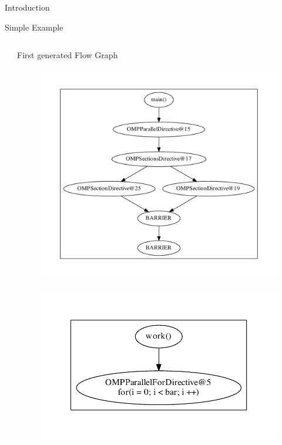 \documentclass[xcolor=dvipsnames]{beamer}
\begin{document}
\begin{section}{Introduction}
\begin{frame}[fragile]{\hskip 0.3cm Simple Example}
\begin{columns}
\begin{column}{5cm}
\end{column}

\begin{column}{6.5cm}
First generated Flow Graph
\vskip -0.5cm
\begin{figure}

\includegraphics[scale=0.3]{main.pdf}
\end{figure}
\vskip -1.5cm
\begin{figure}
\includegraphics[scale=0.3]{work.pdf}
\end{figure}

\end{column}

\end{columns}



\end{frame}
\end{section}
\end{document}
